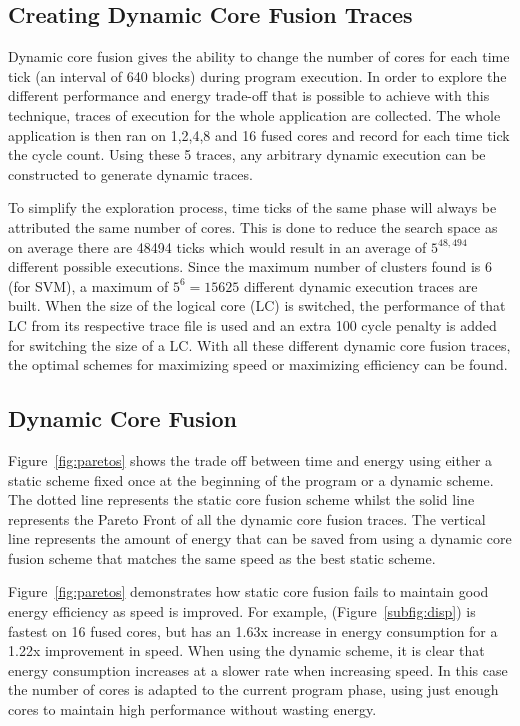 \subsection{Creating Dynamic Core Fusion Traces}

Dynamic core fusion gives the ability to change the number of cores for each time tick (an interval of 640 blocks) during program execution.
In order to explore the different performance and energy trade-off that is possible to achieve with this technique, traces of execution for the whole application are collected.
The whole application is then ran on 1,2,4,8 and 16 fused cores and record for each time tick the cycle count.
Using these 5 traces, any arbitrary dynamic execution can be constructed to generate dynamic traces.

To simplify the exploration process, time ticks of the same phase will always be attributed the same number of cores.
This is done to reduce the search space as on average there are 48494 ticks which would result in an average of $5^{48,494}$ different possible executions.
Since the maximum number of clusters found is 6 (for SVM), a maximum of $5^{6} = 15625$ different dynamic execution traces are built.
When the size of the logical core (LC) is switched, the performance of that LC from its respective trace file is used and an extra 100 cycle penalty is added for switching the size of a LC.
With all these different dynamic core fusion traces, the optimal schemes for maximizing speed or maximizing efficiency can be found.

\subsection{Dynamic Core Fusion}
Figure~\ref{fig:paretos} shows the trade off between time and energy using either a static scheme fixed once at the beginning of the program or a dynamic scheme.
The dotted line represents the static core fusion scheme whilst the solid line represents the Pareto Front of all the dynamic core fusion traces.
The vertical line represents the amount of energy that can be saved from using a dynamic core fusion scheme that matches the same speed as the best static scheme.

Figure~\ref{fig:paretos} demonstrates how static core fusion fails to maintain good energy efficiency as speed is improved.
For example,  (Figure~\ref{subfig:disp}) is fastest on 16 fused cores, but has an 1.63x increase in energy consumption for a 1.22x improvement in speed.
When using the dynamic scheme, it is clear that energy consumption increases at a slower rate when increasing speed.
In this case the number of cores is adapted to the current program phase, using just enough cores to maintain high performance without wasting energy.


